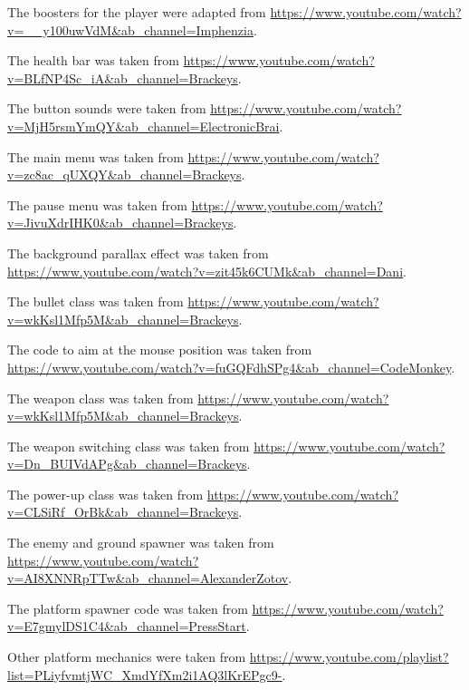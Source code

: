 \documentclass{article}
\begin{document}
The boosters for the player were adapted from \url{https://www.youtube.com/watch?v=__y100uwVdM&ab_channel=Imphenzia}.

The health bar was taken from \url{https://www.youtube.com/watch?v=BLfNP4Sc_iA&ab_channel=Brackeys}.

The button sounds were taken from \url{https://www.youtube.com/watch?v=MjH5rsmYmQY&ab_channel=ElectronicBrai}.

The main menu was taken from \url{https://www.youtube.com/watch?v=zc8ac_qUXQY&ab_channel=Brackeys}.

The pause menu was taken from \url{https://www.youtube.com/watch?v=JivuXdrIHK0&ab_channel=Brackeys}.

The background parallax effect was taken from \url{https://www.youtube.com/watch?v=zit45k6CUMk&ab_channel=Dani}.

The bullet class was taken from \url{https://www.youtube.com/watch?v=wkKsl1Mfp5M&ab_channel=Brackeys}.

The code to aim at the mouse position was taken from \url{https://www.youtube.com/watch?v=fuGQFdhSPg4&ab_channel=CodeMonkey}.

The weapon class was taken from \url{https://www.youtube.com/watch?v=wkKsl1Mfp5M&ab_channel=Brackeys}.

The weapon switching class was taken from \url{https://www.youtube.com/watch?v=Dn_BUIVdAPg&ab_channel=Brackeys}.

The power-up class was taken from \url{https://www.youtube.com/watch?v=CLSiRf_OrBk&ab_channel=Brackeys}.

The enemy and ground spawner was taken from \url{https://www.youtube.com/watch?v=AI8XNNRpTTw&ab_channel=AlexanderZotov}.

The platform spawner code was taken from \url{https://www.youtube.com/watch?v=E7gmylDS1C4&ab_channel=PressStart}.

Other platform mechanics were taken from \url{https://www.youtube.com/playlist?list=PLiyfvmtjWC_XmdYfXm2i1AQ3lKrEPgc9-}.
\end{document}
